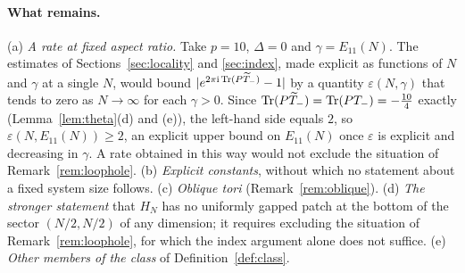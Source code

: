 \paragraph{What remains.}
(a) \emph{A rate at fixed aspect ratio.} Take $p=10$, $\Delta=0$ and $\gamma=E_{11}(N)$. The estimates of Sections~\ref{sec:locality} and
\ref{sec:index}, made explicit as functions of $N$ and $\gamma$ at a single $N$, would bound
$\lvert e^{2\pi\mathrm{i}\operatorname{Tr}(P\widetilde{T}_{-})}-1\rvert$ by a quantity $\varepsilon(N,\gamma)$ that tends to zero as $N\to\infty$ for each $\gamma>0$.
Since $\operatorname{Tr}(P\widetilde{T}_{-})=\operatorname{Tr}(PT_-)=-\frac{10}4$ exactly (Lemma~\ref{lem:theta}(d) and (e)), the left-hand side equals $2$, so
$\varepsilon(N,E_{11}(N))\ge2$, an explicit upper bound on $E_{11}(N)$ once $\varepsilon$ is explicit and decreasing in $\gamma$.
A rate obtained in this way would not exclude the situation of Remark~\ref{rem:loophole}. (b) \emph{Explicit constants},
without which no statement about a fixed system size follows. (c) \emph{Oblique tori} (Remark~\ref{rem:oblique}).
(d) \emph{The stronger statement} that $H_N$ has no uniformly gapped patch at the bottom of the sector $(N/2,N/2)$ of any
dimension; it requires excluding the situation of Remark~\ref{rem:loophole}, for which the index argument alone does
not suffice. (e) \emph{Other members of the class} of Definition~\ref{def:class}.
